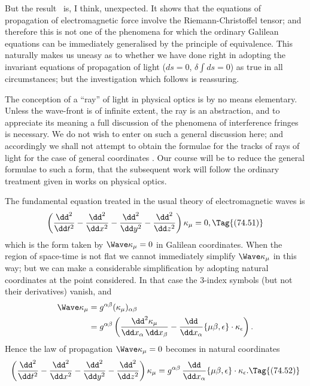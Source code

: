 \documentclass[12pt]{book}
\begin{document}
But the result~ is, I think, unexpected. It shows that the equations
of propagation of electromagnetic force involve the Riemann-Christoffel tensor;
and therefore this is not one of the phenomena for which the ordinary Galilean
equations can be immediately generalised by the principle of equivalence.
This naturally makes us uneasy as to whether we have done right in adopting
the invariant equations of propagation of light ($ds = 0$, $\delta\int ds = 0$) as true in
all circumstances; but the investigation which follows is reassuring.


The conception of a ``ray'' of light in physical optics is by no means
elementary. Unless the wave-front is of infinite extent, the ray is an abstraction,
and to appreciate its meaning a full discussion of the phenomena of
interference fringes is necessary. We do not wish to enter on such a general
discussion here; and accordingly we shall not attempt to obtain the formulae
for the tracks of rays of light for the case of general coordinates .
Our course will be to reduce the general formulae to such a form, that the
subsequent work will follow the ordinary treatment given in works on physical
optics.

The fundamental equation treated in the usual theory of electromagnetic
waves is
\[
\left(\frac{\dd^{2}}{\dd t^{2}}
- \frac{\dd^{2}}{\dd x^{2}}
- \frac{\dd^{2}}{\dd y^{2}}
- \frac{\dd^{2}}{\dd z^{2}}\right) \kappa_{\mu} = 0,
\Tag{(74.51)}
\]
which is the form taken by $\Wave\kappa_{\mu} = 0$ in Galilean coordinates. When the region
of space-time is not flat we cannot immediately simplify $\Wave\kappa_{\mu}$ in this way;
but we can make a considerable simplification by adopting natural coordinates
at the point considered. In that case the $3$-index symbols (but not their
derivatives) vanish, and
\begin{align*}
  \Wave\kappa_{\mu} &= g^{\alpha\beta}(\kappa_{\mu})_{\alpha\beta} \\
  &= g^{\alpha\beta} \left(\frac{\dd^{2}\kappa_{\mu}}{\dd x_{\alpha}\, \dd x_{\beta}}
  - \frac{\dd}{\dd x_{\alpha}} \{\mu\beta, \epsilon\} \cdot \kappa_{\epsilon}\right).
\end{align*}
Hence the law of propagation $\Wave\kappa_{\mu} = 0$ becomes in natural coordinates
\[
\left(\frac{\dd^{2}}{\dd t^{2}}
- \frac{\dd^{2}}{\dd x^{2}}
- \frac{\dd^{2}}{\dd y^{2}}
- \frac{\dd^{2}}{\dd z^{2}}\right) \kappa_{\mu}
= g^{\alpha\beta}\, \frac{\dd}{\dd x_{\alpha}} \{\mu\beta, \epsilon\} \cdot \kappa_{\epsilon}.
\Tag{(74.52)}
\]
\end{document}
